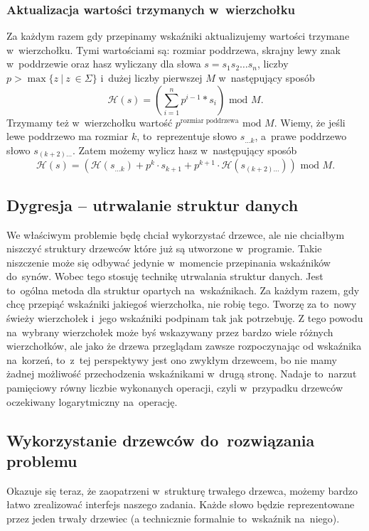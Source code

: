 \documentclass[declaration,shortabstract]{iithesis}
\theoremstyle{definition} \newtheorem{definition}{Definicja}[chapter]
\theoremstyle{remark} \newtheorem{remark}[definition]{Obserwacja}
\theoremstyle{plain} \newtheorem{theorem}[definition]{Twierdzenie}
\theoremstyle{remark} \newtheorem{example}{Przykład}[definition]
\theoremstyle{plain} \newtheorem{lemma}[definition]{Lemat}
\begin{document}
\subsubsection{Aktualizacja wartości trzymanych w~wierzchołku}

Za każdym razem gdy przepinamy wskaźniki aktualizujemy wartości trzymane w~wierzchołku. Tymi wartościami są: rozmiar poddrzewa, skrajny lewy znak w~poddrzewie oraz hasz wyliczany dla słowa $s = s_1 s_2 \ldots s_n$, liczby $p > \max \{ z\ |\ z~\in \Sigma \}$ i~dużej liczby pierwszej $M$ w~następujący sposób $$\mathcal{H}(s) = (\sum_{i=1}^n p^{i-1}*s_i) \text{ mod } M.$$ Trzymamy też w~wierzchołku wartość $p^{\text{rozmiar poddrzewa}} \text{ mod } M$. Wiemy, że jeśli lewe poddrzewo ma rozmiar $k$, to~reprezentuje słowo $s_{\ldots k}$, a~prawe poddrzewo słowo $s_{(k + 2) \ldots}$. Zatem możemy wylicz hasz w~następujący sposób $$ \mathcal{H}(s) = (\mathcal{H}(s_{\ldots k}) + p^k \cdot s_{k+1} + p^{k+1} \cdot \mathcal{H}(s_{(k+2) \ldots})) \text{ mod } M. $$

\subsection{Dygresja -- utrwalanie struktur danych}

We właściwym problemie będę chciał wykorzystać drzewce, ale nie chciałbym niszczyć struktury drzewców które już są utworzone w~programie. Takie niszczenie może się odbywać jedynie w~momencie przepinania wskaźników do~synów. Wobec tego stosuję technikę utrwalania struktur danych. Jest to~ogólna metoda dla struktur opartych na~wskaźnikach. Za każdym razem, gdy chcę przepiąć wskaźniki jakiegoś wierzchołka, nie robię tego. Tworzę za to~nowy świeży wierzchołek i~jego wskaźniki podpinam tak jak potrzebuję. Z tego powodu na~wybrany wierzchołek może byś wskazywany przez bardzo wiele różnych wierzchołków, ale jako że drzewa przeglądam zawsze rozpoczynając od wskaźnika na~korzeń, to~z~tej perspektywy jest ono zwykłym drzewcem, bo nie mamy żadnej możliwość przechodzenia wskaźnikami w~drugą stronę. Nadaje to~narzut pamięciowy równy liczbie wykonanych operacji, czyli w~przypadku drzewców oczekiwany logarytmiczny na~operację.

\subsection{Wykorzystanie drzewców do~rozwiązania problemu}

Okazuje się teraz, że zaopatrzeni w~strukturę trwałego drzewca, możemy bardzo łatwo zrealizować interfejs naszego zadania. Każde słowo będzie reprezentowane przez jeden trwały drzewiec (a technicznie formalnie to~wskaźnik na~niego). 
\end{document}
